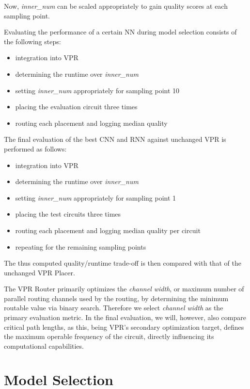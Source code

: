 Now, \textit{inner\_num} can be scaled appropriately to gain quality scores at each sampling point.

Evaluating the performance of a certain \gls{NN} during model selection consists of the following steps:

\begin{itemize}
	\item integration into \gls{VPR}
	\item determining the runtime over \textit{inner\_num}
	\item setting \textit{inner\_num} appropriately for sampling point 10
	\item placing the evaluation circuit three times
	\item routing each placement and logging median quality 
\end{itemize}

The final evaluation of the best \gls{CNN} and \gls{RNN} against unchanged \gls{VPR} is performed as follows:

\begin{itemize}
	\item integration into \gls{VPR}
	\item determining the runtime over \textit{inner\_num}
	\item setting \textit{inner\_num} appropriately for sampling point 1
	\item placing the test circuits three times
	\item routing each placement and logging median quality per circuit
	\item repeating for the remaining sampling points
\end{itemize}

The thus computed quality/runtime trade-off is then compared with that of the unchanged \gls{VPR} Placer.

The \gls{VPR} Router primarily optimizes the \textit{channel width}, or maximum number of parallel routing channels used by the routing, by determining the minimum routable value via binary search. Therefore we select \textit{channel width} as the primary evaluation metric. In the final evaluation, we will, however, also compare critical path lengths, as this, being \gls{VPR}'s secondary optimization target, defines the maximum operable frequency of the circuit, directly influencing its computational capabilities.

\section{Model Selection}\label{ch:model-selection}

